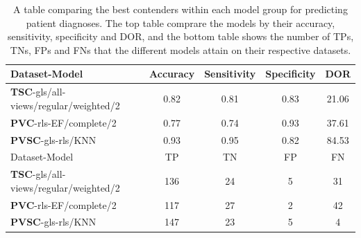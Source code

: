 \begin{table}
    \centering
    \begin{tabular}{lcccc}
        \toprule
        Dataset-Model                                 &  Accuracy &  Sensitivity &  Specificity &  DOR \\
        \midrule
        \textbf{TSC}-gls/all-views/regular/weighted/2 &      0.82 &         0.81 &         0.83 & 21.06 \\
        \textbf{PVC}-rls-EF/complete/2                &      0.77 &         0.74 &         0.93 & 37.61 \\
        \textbf{PVSC}-gls-rls/KNN                     &      0.93 &         0.95 &         0.82 &  84.53 \\
        \midrule
        Dataset-Model                                 &  TP &  TN &  FP &  FN \\
        \midrule
        \textbf{TSC}-gls/all-views/regular/weighted/2 & 136 &  24 &   5 &  31 \\
        \textbf{PVC}-rls-EF/complete/2                & 117 &  27 &   2 &  42 \\
        \textbf{PVSC}-gls-rls/KNN                     & 147 &  23 &  5  &   4 \\
        \bottomrule
    \end{tabular}
    \caption{A table comparing the best contenders within each model group for predicting patient diagnoses. 
             The top table comprare the models by their accuracy, sensitivity, specificity and DOR, 
             and the bottom table shows the number of TPs, TNs, FPs and FNs that the different models attain on their respective datasets.}
    \label{tab:pd_compare}
\end{table}

\newpage

